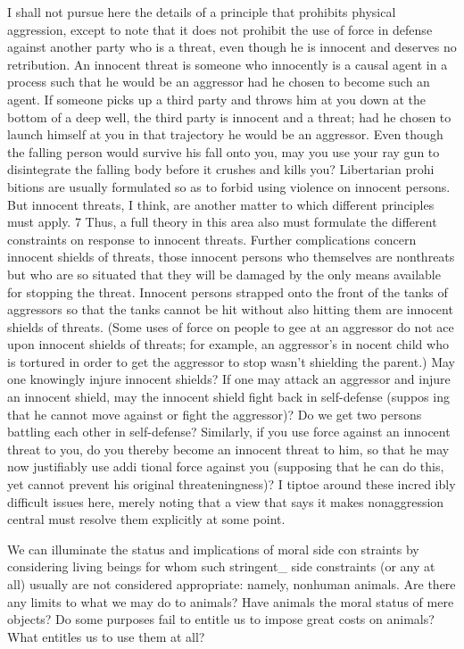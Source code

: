 \documentclass[11pt,openany]{book}
\begin{document}
I shall not pursue here the details of a principle that prohibits physical aggression, except to note that it does not prohibit the use of force in defense against another party who is a threat, even though he is innocent and deserves no retribution. An innocent threat is someone who innocently is a causal agent in a process such that he would be an aggressor had he chosen to become such an agent. If someone picks up a third party and throws him at you down at the bottom of a deep well, the third party is innocent and a threat; had he chosen to launch himself at you in that trajectory he would be an aggressor. Even though the falling person would survive his fall onto you, may you use your ray gun to disintegrate the falling body before it crushes and kills you? Libertarian prohi bitions are usually formulated so as to forbid using violence on innocent persons. But innocent threats, I think, are another matter to which different principles must apply. 7 Thus, a full theory in this area also must formulate the different constraints on response to innocent threats. Further complications concern innocent shields of threats, those innocent persons who themselves are nonthreats but who are so situated that they will be damaged by the only means available for stopping the threat. Innocent persons strapped onto the front of the tanks of aggressors so that the tanks cannot be hit without also hitting them are innocent shields of threats. (Some uses of force on people to gee at an aggressor do not ace upon innocent shields of threats; for example, an aggressor's in nocent child who is tortured in order to get the aggressor to stop wasn't shielding the parent.) May one knowingly injure innocent shields? If one may attack an aggressor and injure an innocent shield, may the innocent shield fight back in self-defense (suppos ing that he cannot move against or fight the aggressor)? Do we get two persons battling each other in self-defense? Similarly, if you use force against an innocent threat to you, do you thereby become an innocent threat to him, so that he may now justifiably use addi tional force against you (supposing that he can do this, yet cannot prevent his original threateningness)? I tiptoe around these incred ibly difficult issues here, merely noting that a view that says it makes nonaggression central must resolve them explicitly at some point. 

We can illuminate the status and implications of moral side con straints by considering living beings for whom such stringent\_ side constraints (or any at all) usually are not considered appropriate: namely, nonhuman animals. Are there any limits to what we may do to animals? Have animals the moral status of mere objects? Do some purposes fail to entitle us to impose great costs on animals? What entitles us to use them at all? 
\end{document}

